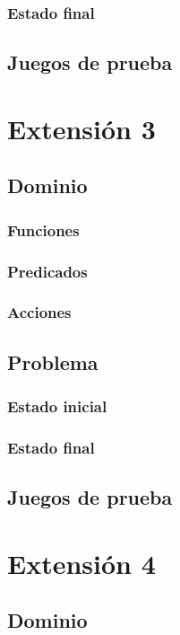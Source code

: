 \documentclass[12pt]{article}
\begin{document}
\subsubsection{Estado final}

\subsection{Juegos de prueba}


\section{Extensión 3}

\subsection{Dominio}
\subsubsection{Funciones}
\subsubsection{Predicados}
\subsubsection{Acciones}

\subsection{Problema}
\subsubsection{Estado inicial}
\subsubsection{Estado final}

\subsection{Juegos de prueba}


\section{Extensión 4}

\subsection{Dominio}
\end{document}
